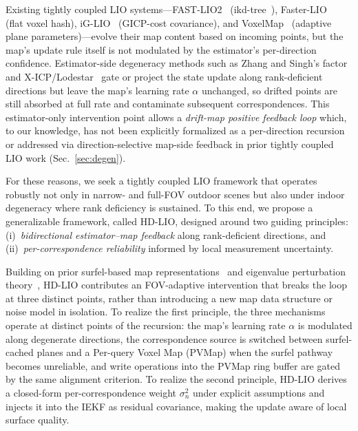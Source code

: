 \documentclass[conference]{IEEEtran}
\begin{document}
Existing tightly coupled LIO systems—FAST-LIO2~\cite{xu2022fastlio2}
(ikd-tree~\cite{cai2022ikdtree}), Faster-LIO~\cite{bai2022fasterlio}
(flat voxel hash), iG-LIO~\cite{chen2024iglio} (GICP-cost covariance),
and VoxelMap~\cite{yuan2022voxelmap} (adaptive plane parameters)—evolve
their map content based on incoming points, but the map's update rule
itself is not modulated by the estimator's per-direction confidence. Estimator-side
degeneracy methods such as Zhang and Singh's
factor~\cite{zhang2016degeneracy} and X-ICP/Lodestar~\cite{li2025lodestar}
gate or project the state update along rank-deficient directions but
leave the map's learning rate $\alpha$ unchanged, so drifted points
are still absorbed at full rate and contaminate subsequent
correspondences. This estimator-only intervention point allows a
\emph{drift-map positive feedback loop} which, to our knowledge, has
not been explicitly formalized as a per-direction recursion or
addressed via direction-selective map-side feedback in prior tightly
coupled LIO work (Sec.~\ref{sec:degen}).

For these reasons, we seek a tightly coupled LIO framework that
operates robustly not only in narrow- and full-FOV outdoor scenes but
also under indoor degeneracy where rank deficiency is sustained.
To this end, we propose a generalizable framework, called HD-LIO,
designed around two guiding principles:
(i)~\emph{bidirectional estimator--map feedback} along rank-deficient
directions, and
(ii)~\emph{per-correspondence reliability} informed by local
measurement uncertainty.

Building on prior surfel-based map representations~\cite{behley2018suma,
yuan2022voxelmap} and eigenvalue perturbation theory~\cite{stewart1990matrix},
HD-LIO contributes an FOV-adaptive intervention that breaks the loop at
three distinct points, rather than introducing a new map data
structure or noise model in isolation. To realize the first principle, the three mechanisms operate
at distinct points of the recursion: the map's learning rate $\alpha$
is modulated along degenerate directions, the correspondence source is
switched between surfel-cached planes and a Per-query Voxel Map (PVMap)
when the surfel pathway becomes unreliable, and write operations into
the PVMap ring buffer are gated by the same alignment criterion. To
realize the second principle, HD-LIO derives a closed-form
per-correspondence weight $\sigma^2_n$ under explicit assumptions and
injects it into the IEKF as residual covariance, making the update
aware of local surface quality.
\end{document}

